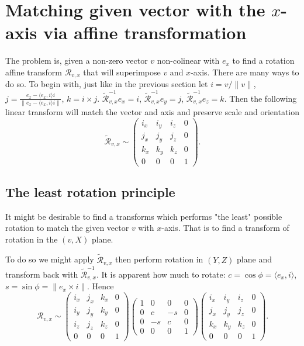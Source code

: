 \documentclass[a4paper]{article}
\begin{document}
\section{Matching given vector with the \(x\)-axis via affine transformation}
The problem is, given a non-zero vector \( v \)
non-colinear with \(e_x\)
to find a rotation affine transform \( \mathcal{R}_{v,x} \)
that will superimpose \(v\) and \(x\)-axis.
There are many ways to do so.
To begin with,
just like in the previous section let
\( i = v/\|v\| \),
\( j = \frac{e_x - \langle e_x,i\rangle i}{\|e_x - \langle e_x,i\rangle i\|} \),
\( k = i\times j \).
\( \mathcal{\tilde R}_{v,x}^{-1} e_x = i \),
\( \mathcal{\tilde R}_{v,x}^{-1} e_y = j \),
\( \mathcal{\tilde R}_{v,x}^{-1} e_z = k \).
Then the following linear transform
will match the vector and axis
and preserve scale and orientation
\[ \mathcal{\tilde R}_{v,x} \sim
    \begin{pmatrix}
        i_x & i_y & i_z & 0 \\
        j_x & j_y & j_z & 0 \\
        k_x & k_y & k_z & 0 \\
        0   & 0   & 0   & 1 
    \end{pmatrix}. \]

\subsection{The least rotation principle}
It might be desirable to find a transforms
which  performs "the least" possible rotation
to match the given vector \( v \) with \(x\)-axis.
That is to find a transform
of rotation in the \((v,X)\) plane.

To do so we might apply \( \mathcal{\tilde R}_{v,x} \)
then perform rotation in \((Y,Z)\) plane
and transform back with \( \mathcal{\tilde R}_{v,x}^{-1} \).
It is apparent how much to rotate:
\( c = \cos\phi = \langle e_x, i \rangle \),
\( s = \sin\phi = \| e_x\times i \| \).
Hence
\[ \mathcal{R}_{v,x} \sim
    \begin{pmatrix}
        i_x & j_x & k_x & 0 \\
        i_y & j_y & k_y & 0 \\
        i_z & j_z & k_z & 0 \\
        0   & 0   & 0   & 1 
    \end{pmatrix}
    \begin{pmatrix}
        1 & 0  & 0  & 0 \\
        0 & c  & -s & 0 \\
        0 & -s & c  & 0 \\
        0 & 0  & 0  & 1
    \end{pmatrix}
    \begin{pmatrix}
        i_x & i_y & i_z & 0 \\
        j_x & j_y & j_z & 0 \\
        k_x & k_y & k_z & 0 \\
        0   & 0   & 0   & 1 
    \end{pmatrix}. \]
\end{document}
